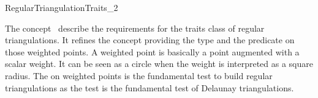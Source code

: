 

\begin{ccRefConcept}{RegularTriangulationTraits_2}

\ccDefinition
  
The concept \ccRefName\ describe the requirements
for the traits class of regular triangulations. It refines  the 
concept  
providing  the  type
 and the   predicate on those 
weighted points.
A weighted point is basically 
a point augmented with a scalar weight. It can be seen as a circle
when the weight is interpreted as a square radius.
The   on weighted points
is the fundamental test to build regular triangulations 
as  the  test is the fundamental test
of Delaunay triangulations.


\ccRefines
{}

\ccTypes
{}
\ccGlue    
{} 


\end{ccRefConcept}
